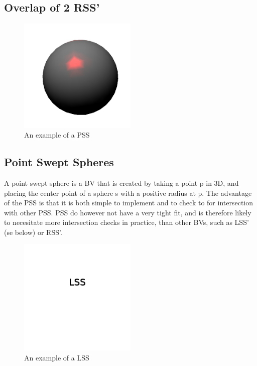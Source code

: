 \subsection{Overlap of 2 RSS'}


\begin{figure}
\centering
\includegraphics[width=0.5\textwidth]{figures/pss}
\caption{\label{pss-example}An example of a PSS}
\end{figure}

\subsection{Point Swept Spheres}
A point swept sphere is a BV that is created by taking a point p in 3D, and placing the center point of a sphere s with a positive radius at p. The advantage of the PSS is that it is both simple to implement and to check to for intersection with other PSS. PSS do however not have a very tight fit, and is therefore likely to necesitate more intersection checks in practice, than other BVs, such as LSS' (se below) or RSS'.

\begin{figure}
\centering
\includegraphics[width=0.5\textwidth]{figures/lss}
\caption{\label{lss-example}An example of a LSS}
\end{figure}

